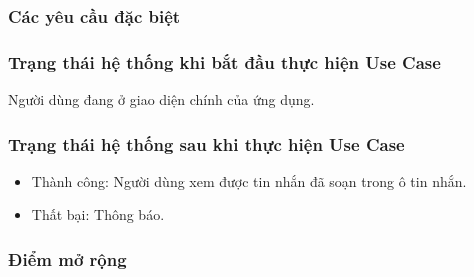 \subsubsection{Các yêu cầu đặc biệt}

\subsubsection{Trạng thái hệ thống khi bắt đầu thực hiện Use Case}
Người dùng đang ở giao diện chính của ứng dụng.

\subsubsection{Trạng thái hệ thống sau khi thực hiện Use Case}
\begin{itemize}
    \item Thành công: Người dùng xem được tin nhắn đã soạn trong ô tin nhắn.
    \item Thất bại: Thông báo.
\end{itemize}

\subsubsection{Điểm mở rộng}